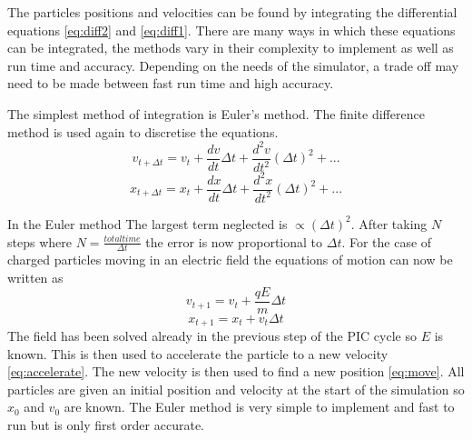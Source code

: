 \documentclass[12pt]{article}
\def\be{\begin{equation}}
\def\ee{\end{equation}}
\begin{document}
The particles positions and velocities can be found by integrating the differential equations \eqref{eq:diff2} and \eqref{eq:diff1}. There are many ways in which these equations can be integrated, the methods vary in their complexity to implement as well as run time and accuracy. Depending on the needs of the simulator, a trade off may need to be made between fast run time and high accuracy. 

The simplest method of integration is Euler's method.
The finite difference method is used again to discretise the equations. 
\be 
v_{t+\Delta t} = v_t + \frac{dv}{dt} \Delta t + \frac{d^2v}{dt^2} {(\Delta t)}^2 + ...
\ee
\be 
x_{t+\Delta t} = x_t + \frac{dx}{dt} \Delta t + \frac{d^2x}{dt^2} {(\Delta t)}^2 + ...
\ee

In the Euler method The largest term neglected is $\propto {(\Delta t)}^2$. After taking $N$ steps where $N = \frac{total time}{\Delta t}$ the error is now proportional to $\Delta t$. For the case of charged particles moving in an electric field the equations of motion can now be written as
\be
v_{t+1} = v_t + \frac{qE}{m} \Delta t
\label{eq:accelerate}
\ee
\be 
x_{t+1} = x_t + v_t \Delta t
\label{eq:move}
\ee 
The field has been solved already in the previous step of the PIC cycle so $E$ is known. This is then used to accelerate the particle to a new velocity \eqref{eq:accelerate}. The new velocity is then used to find a new position \eqref{eq:move}. All particles are given an initial position and velocity at the start of the simulation so $x_0$ and $v_0$ are known.  The Euler method is very simple to implement and fast to run but is only first order accurate.
\end{document}
